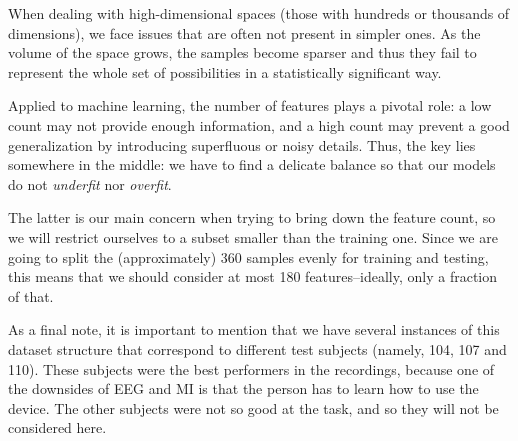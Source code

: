 	When dealing with high-dimensional spaces (those with hundreds or thousands of dimensions), we face issues that are often not present in simpler ones. As the volume of the space grows, the samples become sparser and thus they fail to represent the whole set of possibilities in a statistically significant way.

	Applied to machine learning, the number of features plays a pivotal role: a low count may not provide enough information, and a high count may prevent a good generalization by introducing superfluous or noisy details. Thus, the key lies somewhere in the middle: we have to find a delicate balance so that our models do not \textit{underfit} nor \textit{overfit}. 

\newpage

	The latter is our main concern when trying to bring down the feature count, so we will restrict ourselves to a subset smaller than the training one. Since we are going to split the (approximately) 360 samples evenly for training and testing, this means that we should consider at most 180 features--ideally, only a fraction of that.

	As a final note, it is important to mention that we have several instances of this dataset structure that correspond to different test subjects (namely, 104, 107 and 110). These subjects were the best performers in the recordings, because one of the downsides of \acs{EEG} and \acs{MI} is that the person has to learn how to use the device. The other subjects were not so good at the task, and so they will not be considered here.